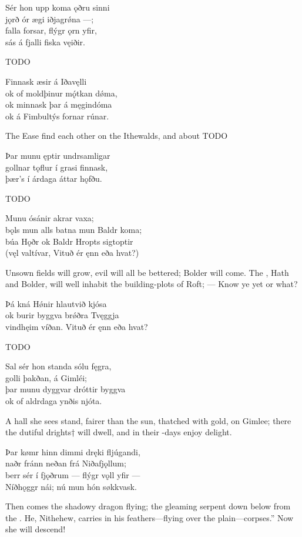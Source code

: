 \bva Sér hon upp koma \hld ǫðru sinni \\%
jǫrð ór ægi \hld iðjagrǿna —; \\%
falla forsar, \hld flýgr ǫrn yfir, \\%
sás á fjalli \hld fiska vęiðir.\eva

\bvb TODO\evb

\bva Finnask æsir \hld á Iðavęlli \\%
ok of moldþinur \hld mǫ́tkan dǿma, \\%
ok minnask þar \hld á męgindóma \\%
ok á Fimbultýs \hld fornar rúnar.\eva

\bvb The Ease find each other on the Ithewalds, and about TODO\evb

\bva Þar munu ęptir \hld undrsamligar \\%
gollnar tǫflur \hld í grasi finnask, \\%
þær’s í árdaga \hld áttar hǫfðu.\eva

\bvb TODO\evb

\bva Munu ósánir \hld akrar vaxa; \\%
bǫls mun alls batna \hld mun Baldr koma; \\%
búa Hǫðr ok Baldr \hld Hropts sigtoptir \\%
(vęl valtívar, \hld Vituð ér ęnn eða hvat?)\eva

\bvb Unsown fields will grow, evil will all be bettered; Bolder will come. The , Hath and Bolder, will well inhabit the building-plots of Roft; — Know ye yet or what?\evb

\bva Þá kná Hǿnir \hld hlautvið kjósa \\%
ok burir byggva \hld brǿðra Tvęggja \\%
vindhęim víðan. \hld Vituð ér ęnn eða hvat?\eva

\bvb TODO\evb

\bva Sal sér hon standa \hld sólu fęgra, \\%
golli þakðan, \hld á Gimléi; \\%
þar munu dyggvar \hld dróttir byggva \\%
ok of aldrdaga \hld ynðis njóta.\eva

\bvb A hall she sees stand, fairer than the sun, thatched with gold, on Gimlee; there the dutiful drights† will dwell, and in their -days enjoy delight.\evb

\bva Þar kømr hinn dimmi \hld dręki fljúgandi, \\%
naðr fránn neðan \hld frá Niðafjǫllum; \\%
berr sér í fjǫðrum \hld — flýgr vǫll yfir — \\%
Níðhǫggr nái; \hld nú mun hón søkkvask.\eva

\bvb Then comes the shadowy dragon flying; the gleaming serpent down below from the . He, Nithehew, carries in his feathers—flying over the plain—corpses.” Now she will descend!\footnotemark[1]\evb
{}
